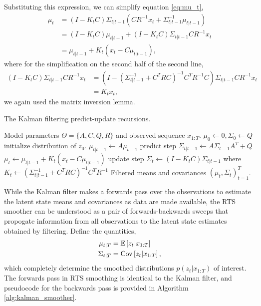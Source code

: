 Substituting this expression, we can simplify equation \ref{eq:mu_t},
\begin{align*}
  \mu_{t} &= \left(I - K_{t} C\right)\Sigma_{t \vert t - 1}\left(C R^{-1}x_{t} + \Sigma_{t \vert t - 1}^{-1} \mu_{t \vert t - 1}\right) \\
  &= \left(I - K_{t}C\right)\mu_{t \vert t - 1} + \left(I - K_{t} C\right)\Sigma_{t \vert t - 1}C R^{-1} x_{t} \\
  &= \mu_{t \vert t - 1} + K_{t}\left(x_{t} - C\mu_{t \vert t- 1}\right),
\end{align*}
where for the simplification on the second half of the second line,
\begin{align*}
  \left(I - K_{t}C\right)\Sigma_{t \vert t - 1} C R^{-1} x_{t} &= \left(I - \left(\Sigma_{t \vert t - 1}^{-1} + C^{T} R C\right)^{-1}C^{T}R^{-1}C\right)\Sigma_{t \vert t - 1}C R^{-1} x_{t} \\
  &= K_{t}x_{t},
\end{align*}
we again used the matrix inversion lemma.

\begin{algorithm}
   \caption{The Kalman filtering predict-update recursions.}
   \label{alg:kalman_filter}
\begin{algorithmic}
   Model parameters $\Theta = \{A, C, Q, R\}$ and
    observed sequence $x_{1:T}$.
    \STATE $\mu_{0} \leftarrow 0, \Sigma_{0} \leftarrow Q$ \hfill initialize distribution of
    $z_{0}$.
    \STATE $\mu_{t \vert t - 1} \leftarrow A\mu_{t - 1}$ \hfill predict step
    \STATE $\Sigma_{t \vert t - 1} \leftarrow A \Sigma_{t - 1} A^{T} + Q$
    \STATE $\mu_{t} \leftarrow \mu_{t \vert t - 1} + K_{t}\left(x_{t} - C\mu_{t \vert t - 1}\right)$ \hfill update step
    \STATE $\Sigma_{t} \leftarrow \left(I - K_{t}C\right)\Sigma_{t \vert t - 1}$
    \STATE where $K_{t} \leftarrow \left(\Sigma_{t \vert t - 1}^{-1} + C^{T}R C\right)^{-1} C^{T}R^{-1}$
    \ENDFOR
     Filtered means and covariances $\left(\mu_{t},
    \Sigma_{t}\right)_{t = 1}^{T}$.
\end{algorithmic}
\end{algorithm}
While the Kalman filter makes a forwards pass over the observations to estimate
the latent state means and covariances as data are made available, the RTS
smoother can be understood as a pair of forwards-backwards sweeps that propogate
information from all observations to the latent state estimates obtained by
filtering. Define the quantities,
\begin{align*}
\mu_{t \vert T} &= \mathbb{E}\left[{z_{t} \vert x_{1:T}}\right] \\
\Sigma_{t \vert T} &= \mathrm{Cov}\left[{z_{t} \vert x_{1:T}}\right],
\end{align*}
which completely determine the smoothed distributions $p\left(z_{t} \vert
x_{1:T}\right)$ of interest. The forwards pass in RTS smoothing is identical to
the Kalman filter, and pseudocode for the backwards pass is provided in
Algorithm \ref{alg:kalman_smoother}.


